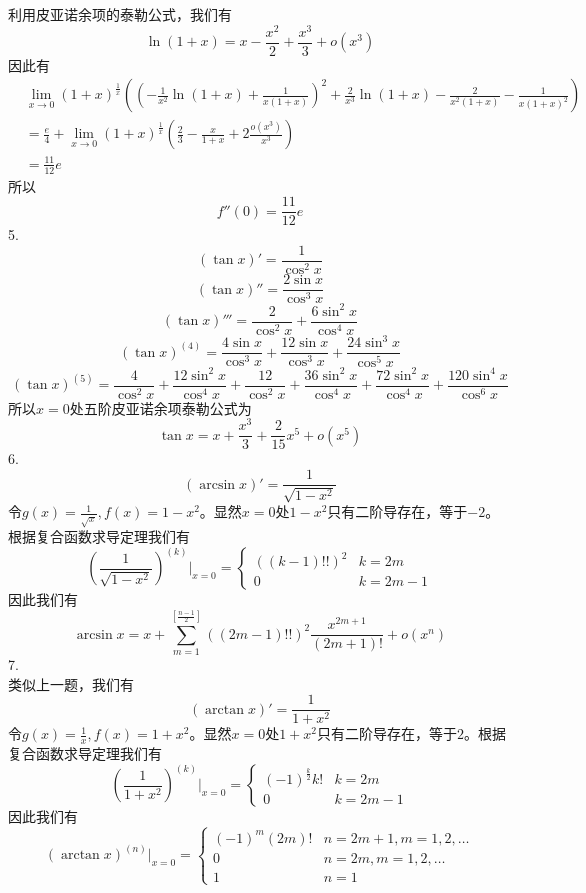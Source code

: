 \documentclass[utf8]{ctexart}
\begin{document}
利用皮亚诺余项的泰勒公式，我们有
\[\ln(1+x)=x-\frac{x^2}{2}+\frac{x^3}{3}+o(x^3)\]
因此有
\begin{align*}
	&\lim\limits_{x\rightarrow0}(1+x)^\frac{1}{x}((-\frac{1}{x^2}\ln(1+x)+\frac{1}{x(1+x)})^2+\frac{2}{x^3}\ln(1+x)-\frac{2}{x^2(1+x)}-\frac{1}{x(1+x)^2})\\
	&=\frac{e}{4}+\lim\limits_{x\rightarrow0}(1+x)^\frac{1}{x}(\frac{2}{3}-\frac{x}{1+x}+2\frac{o(x^3)}{x^3})\\
	&=\frac{11}{12}e
\end{align*}
所以
\[f''(0)=\frac{11}{12}e\]
5.\\
\[(\tan x)'=\frac{1}{\cos^2x}\]
\[(\tan x)''=\frac{2\sin x}{\cos^3x}\]
\[(\tan x)'''=\frac{2}{\cos^2x}+\frac{6\sin^2x}{\cos^4x}\]
\[(\tan x)^{(4)}=\frac{4\sin x}{\cos^3x}+\frac{12\sin x}{\cos^3x}+\frac{24\sin^3x}{\cos^5x}\]
\[(\tan x)^{(5)}=\frac{4}{\cos^2x}+\frac{12\sin^2x}{\cos^4x}+\frac{12}{\cos^2x}+\frac{36\sin^2x}{\cos^4x}+\frac{72\sin^2x}{\cos^4x}+\frac{120\sin^4x}{\cos^6x}\]
所以$x=0$处五阶皮亚诺余项泰勒公式为
\[\tan x=x+\frac{x^3}{3}+\frac{2}{15}x^5+o(x^5)\]
6.\\
\[(\arcsin x)'=\frac{1}{\sqrt{1-x^2}}\]
令$g(x)=\frac{1}{\sqrt{x}},f(x)=1-x^2$。显然$x=0$处$1-x^2$只有二阶导存在，等于$-2$。根据复合函数求导定理我们有
\[(\frac{1}{\sqrt{1-x^2}})^{(k)}|_{x=0}=\begin{cases}
	((k-1)!!)^2&k=2m\\
	0&k=2m-1
\end{cases}\]
因此我们有
\[\arcsin x=x+\sum_{m=1}^{[\frac{n-1}{2}]}((2m-1)!!)^2\frac{x^{2m+1}}{(2m+1)!}+o(x^n)\]
7.\\
类似上一题，我们有
\[(\arctan x)'=\frac{1}{1+x^2}\]
令$g(x)=\frac{1}{x},f(x)=1+x^2$。显然$x=0$处$1+x^2$只有二阶导存在，等于$2$。根据复合函数求导定理我们有
\[(\frac{1}{1+x^2})^{(k)}|_{x=0}=\begin{cases}
	(-1)^{\frac{k}{2}}k!&k=2m\\
	0&k=2m-1
\end{cases}\]
因此我们有
\[(\arctan x)^{(n)}|_{x=0}=\begin{cases}
	(-1)^m(2m)!&n=2m+1,m=1,2,\dots\\
	0&n=2m,m=1,2,\dots\\
	1&n=1
\end{cases}\]
\end{document}
